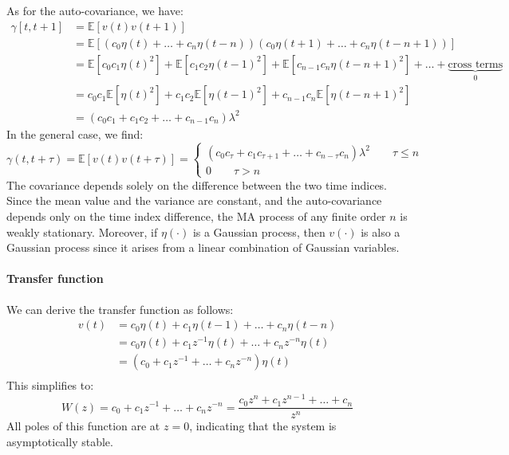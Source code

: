 As for the auto-covariance, we have:
\begin{align*}
    \gamma\left[t,t+1\right]    &= \mathbb{E}\left[v(t)v(t+1)\right] \\
                                &= \mathbb{E}\left[\left( c_0\eta(t) + \dots + c_n\eta(t-n) \right)\left( c_0\eta(t+1) + \dots + c_n\eta(t-n+1) \right)\right] \\
                                &= \mathbb{E}\left[ c_0c_1 \eta(t)^2 \right] + \mathbb{E}\left[ c_1c_2 \eta(t-1)^2 \right] + \mathbb{E}\left[ c_{n-1}c_n \eta(t-n+1)^2 \right] + \dots + \underbrace{\text{cross terms}}_0   \\
                                &= c_0c_1\mathbb{E}\left[  \eta(t)^2 \right] + c_1c_2\mathbb{E}\left[  \eta(t-1)^2 \right] + c_{n-1}c_n\mathbb{E}\left[  \eta(t-n+1)^2 \right] \\        
                                &= \left(c_0c_1 + c_1c_2 + \dots + c_{n-1}c_n\right)\lambda^2                        
\end{align*}
In the general case, we find:
\[\gamma(t,t+\tau)=\mathbb{E}\left[v(t)v(t+\tau)\right]=\begin{cases}
    \left(c_0c_\tau + c_1c_{\tau+1} + \dots + c_{n-\tau}c_n\right)\lambda^2    \qquad \tau \leq n \\
    0 \qquad \tau > n
\end{cases}\]
The covariance depends solely on the difference between the two time indices.
Since the mean value and the variance are constant, and the auto-covariance depends only on the time index difference, the MA process of any finite order $n$ is weakly stationary.
Moreover, if $\eta(\cdot)$ is a Gaussian process, then $v(\cdot)$ is also a Gaussian process since it arises from a linear combination of Gaussian variables.

\paragraph*{Transfer function}
We can derive the transfer function as follows:
\begin{align*}
    v(t)    &= c_0\eta(t) + c_1\eta(t-1) + \dots + c_n\eta(t-n) \\
            &= c_0\eta(t) + c_1z^{-1}\eta(t) + \dots + c_nz^{-n}\eta(t) \\
            &= \left(c_0 + c_1z^{-1} + \dots + c_nz^{-n}\right)\eta(t) \\                  
\end{align*}
This simplifies to:
\[W(z)=c_0 + c_1z^{-1} + \dots + c_nz^{-n}=\dfrac{c_0z^n + c_1z^{n-1} + \dots + c_n}{z^n}\]
All poles of this function are at $z=0$, indicating that the system is asymptotically stable.

